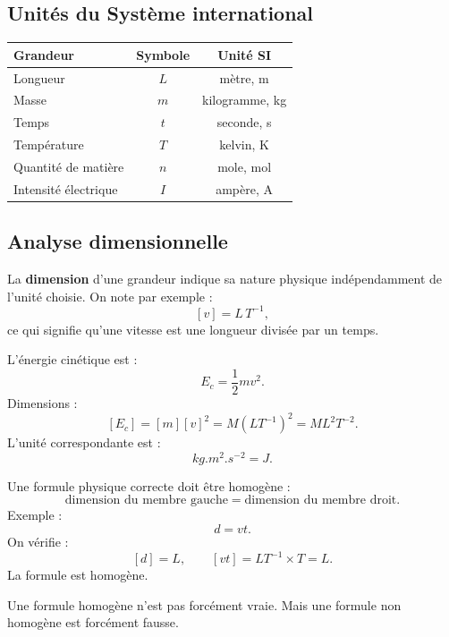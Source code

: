 \documentclass[11pt,a4paper]{article}
\begin{document}
\subsection{Unités du Système international}

\begin{center}
\renewcommand{\arraystretch}{1.3}
\begin{tabularx}{\textwidth}{|X|c|c|}
\hline
\textbf{Grandeur} & \textbf{Symbole} & \textbf{Unité SI} \\
\hline
Longueur & $L$ & mètre, \si{m} \\
\hline
Masse & $m$ & kilogramme, \si{kg} \\
\hline
Temps & $t$ & seconde, \si{s} \\
\hline
Température & $T$ & kelvin, \si{K} \\
\hline
Quantité de matière & $n$ & mole, \si{mol} \\
\hline
Intensité électrique & $I$ & ampère, \si{A} \\
\hline
\end{tabularx}
\end{center}

\subsection{Analyse dimensionnelle}

\begin{definition}
La \textbf{dimension} d'une grandeur indique sa nature physique indépendamment de l'unité choisie.  
On note par exemple :
\[
[v]=L\,T^{-1},
\]
ce qui signifie qu'une vitesse est une longueur divisée par un temps.
\end{definition}

\begin{exemple}
L'énergie cinétique est :
\[
E_c=\frac12mv^2.
\]
Dimensions :
\[
[E_c]=[m][v]^2=M(LT^{-1})^2=ML^2T^{-2}.
\]
L'unité correspondante est :
\[
\si{kg.m^2.s^{-2}}=\si{J}.
\]
\end{exemple}

\begin{methode}
Une formule physique correcte doit être homogène :
\[
\text{dimension du membre gauche}=\text{dimension du membre droit}.
\]
Exemple :
\[
d=vt.
\]
On vérifie :
\[
[d]=L,
\qquad
[vt]=LT^{-1}\times T=L.
\]
La formule est homogène.
\end{methode}

\begin{alerte}
Une formule homogène n'est pas forcément vraie.  
Mais une formule non homogène est forcément fausse.
\end{alerte}
\end{document}
